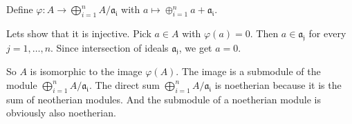 \newcommand{\sheet}{5}




\maketitle

\begin{exercise}{1}

    Define $\varphi \colon A \rightarrow \bigoplus^n_{i=1} A / \mathfrak{a_i}$
    with $a \mapsto \oplus^n_{i=1} a + \mathfrak{a_i}$.

    Lets show that it is injective. Pick $a \in A$ with $\varphi(a) = 0$. Then
    $a \in \mathfrak{a_j}$ for every $j = 1, \ldots, n$. Since intersection of
    ideals $\mathfrak{a_j}$, we get $a = 0$.

    So $A$ is isomorphic to the image $\varphi(A)$. The image is a submodule of
    the module $\bigoplus^n_{i=1} A / \mathfrak{a_i}$. The direct sum
    $\bigoplus^n_{i=1} A / \mathfrak{a_i}$ is noetherian because it is the sum
    of neotherian modules. And the submodule of a noetherian module is obviously
    also noetherian.
\end{exercise}

